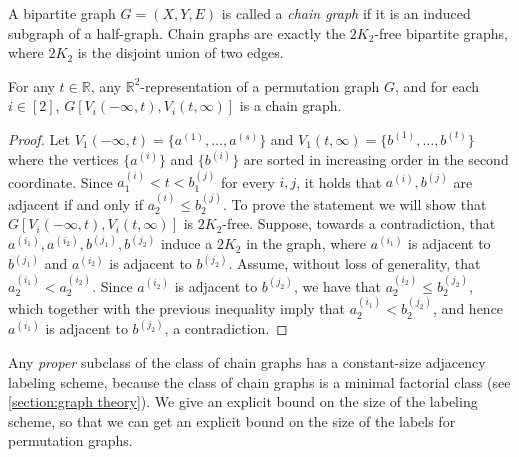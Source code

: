 \documentclass{article}
\newcommand{\bR}{\ensuremath{\mathbb{R}}}
\begin{document}
\newcommand{\twH}{H^{\mathrm{tw}}}
A bipartite graph $G = (X,Y,E)$ is called a \emph{chain graph} if it is an induced subgraph of a half-graph.  Chain graphs are exactly the $2K_2$-free bipartite graphs,
where $2K_2$ is the disjoint union of two edges.

\begin{proposition}
	\label{prop:twinned half-graph}
	For any $t \in \bR$, any $\bR^2$-representation of a permutation graph $G$, and for each $i \in [2]$, $G[V_i(-\infty,t),V_i(t,\infty)]$ is a chain graph.
\end{proposition}
\begin{proof}
	Let $V_1(-\infty,t) = \{a^{(1)}, \dotsc, a^{(s)} \}$ and $V_1(t, \infty) = \{b^{(1)}, \dotsc,
	b^{(t)}\}$ where the vertices $\{a^{(i)}\}$ and $\{b^{(i)}\}$ are sorted in increasing order in the
	second coordinate. Since $a^{(i)}_1 < t < b^{(j)}_1$ for every $i,j$, it holds that
	$a^{(i)},b^{(j)}$ are adjacent if and only if $a^{(i)}_2 \leq b^{(j)}_2$. 
	To prove the statement we will show that $G[V_i(-\infty,t),V_i(t,\infty)]$ is $2K_2$-free.
	Suppose, towards a contradiction, that $a^{(i_1)}, a^{(i_2)}, b^{(j_1)}, b^{(j_2)}$ induce a $2K_2$ in the graph,
	where $a^{(i_1)}$ is adjacent to $b^{(j_1)}$ and $a^{(i_2)}$ is adjacent to $b^{(j_2)}$.
	Assume, without loss of generality, that $a_2^{(i_1)} < a_2^{(i_2)}$. Since $a^{(i_2)}$ is adjacent to $b^{(j_2)}$,
	we have that $a_2^{(i_2)} \leq b_2^{(j_2)}$, which together with the previous inequality imply that 
	$a_2^{(i_1)} < b_2^{(j_2)}$, and hence $a^{(i_1)}$ is adjacent to $b^{(j_2)}$, a contradiction.
\end{proof}

Any \emph{proper} subclass of the class of chain graphs has a constant-size adjacency labeling scheme, because
the class of chain graphs is a minimal factorial class (see \cref{section:graph theory}). We give an explicit bound on the size of the labeling
scheme, so that we can get an explicit bound on the size of the labels for permutation graphs.
\end{document}
